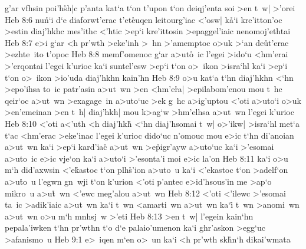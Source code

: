 g'ar
vfhsin
poi'h\r{s}h|c
p'anta
kat`a
t`on
t'upon
t`on
deiqj'enta
soi
>en
t~w|
>'orei\bibvsend
\vs Heb 8:6
nu\r{n}`i
d`e
diaforwt'erac
t'et\r{e}uqen
leitourg'iac
<'osw|
k\r{a}`i
kre'itton'oc
>estin
diaj'hkhc
mes'ithc
<'htic
>ep`i
kre'ittosin
>epaggel'iaic
nenomoj'ethtai\bibvsend
\vs Heb 8:7
e>i
g`ar
<h
pr'wth
>eke'inh
>~hn
>'amemptoc
o>uk
>`an
de\r{u}t'erac
>ezhte~ito
t'opoc\bibvsend
\vs Heb 8:8
memf'omenoc
g`ar
a>ut\r{o}~ic
l'egei
>ido`u
<hm'erai
>'erqontai
l'egei
k'urioc
ka`i
suntel'esw
>ep`i
t`on
o>~ikon
>isra`hl
ka`i
>ep`i
t`on
o>~ikon
>io'uda
diaj'hkhn
kain'hn\bibvsend
\vs Heb 8:9
o>u
kat`a
t`hn
diaj'hkhn
<`hn
>epo'ihsa
to~ic
patr'asin
a>ut~wn
>en
<hm'e\r{r}a|
>epilabom'enou
mou
t~hc
qeir`oc
a>ut~wn
>exagage~in
a>uto`uc
>ek
g~hc
a>ig'uptou
<'oti
a>uto`i
o>uk
>en'emeinan
>en
t~h|
diaj'hkh|
mou
k>ag`w
>hm'elhsa
a>ut~wn
l'egei
k'urioc\bibvsend
\vs Heb 8:10
<'oti
a<'uth
<h
diaj'hk\r{h}
<`hn
diaj'hsomai
t~w|
o>'ikw|
>isra`hl
met`a
t`ac
<hm'erac
>eke'inac
l'egei
k'urioc
dido`uc
n'omouc
mou
e>ic
t`hn
di'anoian
a>ut~wn
ka`i
>ep`i
kard'ia\r{c}
a>ut~wn
>e\r{p}igr'ayw
a>uto`uc
ka`i
>'esomai
a>uto~ic
e>ic
vje`on
ka`i
a>uto`i
>'esonta'i
moi
e>ic
la'on\bibvsend
\vs Heb 8:11
ka`i
o>u
m`h
did'axwsin
<'e\r{k}astoc
t`on
plh\r{s}'ion
a>uto~u
ka`i
<'ekastoc
t`on
>adelf`on
a>u\r{t}o~u
l'egwn
gn~wji
t`on
k'urion
<'oti
p'antec
e>id'hsous'in
me
>ap`o
mikro~u
a>u\r{t}~wn
<'ewc
meg'alou
a>ut~wn\bibvsend
\vs Heb 8:12
<'oti
<'ilewc
>'esomai
ta~ic
>adik'iaic
a>ut~wn
ka`i
t~wn
<amarti~wn
a>ut~wn
ka`i\r{}
t~wn
>anomi~wn
a>ut~wn
o>u
m`h
mnhsj~w
>'eti\bibvsend
\vs Heb 8:13
>en
t~w|
l'egein
kain`hn
pepala'iwken
t`hn
pr'wthn
t`o
d`e
palaio'umenon
ka`i
ghr'askon
>egg`uc
>afanismo~u\bibvsend
\vs Heb 9:1
e>~iqen
m`en
o>~un
ka`i
<h
pr'wth
sk\r{h}n`h
dikai'wmata
